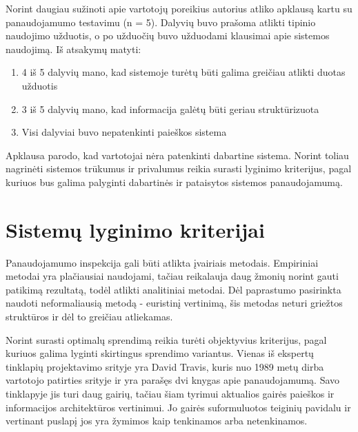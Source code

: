 \documentclass{VUMIFPSkursinis}
\begin{document}
Norint daugiau sužinoti apie vartotojų poreikius autorius atliko apklausą kartu su panaudojamumo testavimu (n = 5). Dalyvių buvo prašoma atlikti tipinio naudojimo užduotis, o po užduočių buvo užduodami klausimai apie sistemos naudojimą. Iš atsakymų matyti:
\begin{enumerate}
\item 4 iš 5 dalyvių mano, kad sistemoje turėtų būti galima greičiau atlikti duotas užduotis
\item 3 iš 5 dalyvių mano, kad informacija galėtų būti geriau struktūrizuota
\item Visi dalyviai buvo nepatenkinti paieškos sistema
\end{enumerate}

Apklausa parodo, kad vartotojai nėra patenkinti dabartine sistema. Norint toliau nagrinėti sistemos trūkumus ir privalumus reikia surasti lyginimo kriterijus, pagal kuriuos bus galima palyginti dabartinės ir pataisytos sistemos panaudojamumą.



\section{Sistemų lyginimo kriterijai}
Panaudojamumo inspekcija gali būti atlikta įvairiais metodais. Empiriniai metodai yra plačiausiai naudojami\cite{NielsenUsabilityEn}, tačiau reikalauja daug žmonių norint gauti patikimą rezultatą, todėl atlikti analitiniai metodai. Dėl paprastumo pasirinkta naudoti neformaliausią metodą - euristinį vertinimą, šis metodas neturi griežtos struktūros ir dėl to greičiau atliekamas.

Norint surasti optimalų sprendimą reikia turėti objektyvius kriterijus, pagal kuriuos galima lyginti skirtingus sprendimo variantus. Vienas iš ekspertų tinklapių projektavimo srityje yra David Travis, kuris nuo 1989 metų dirba vartotojo patirties srityje ir yra parašęs dvi knygas apie panaudojamumą. Savo tinklapyje jis turi daug gairių, tačiau šiam tyrimui aktualios gairės paieškos ir informacijos architektūros vertinimui. Jo gairės suformuluotos teiginių pavidalu ir vertinant puslapį jos yra žymimos kaip tenkinamos arba netenkinamos\cite{SearchGuidelinesEn}\cite{NavigationAndIAGuidelinesEn}. 
\end{document}
